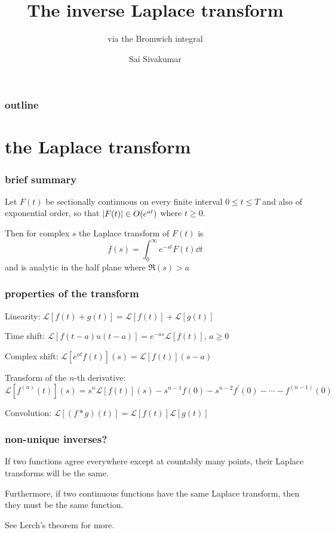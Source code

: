 \documentclass[mathserif]{beamer}
\title[The inverse Laplace transform] %
{The inverse Laplace transform}
\subtitle{via the Bromwich integral}
\author[Sai Sivakumar] %
{Sai Sivakumar}
\begin{document}
\frame{\titlepage}

\begin{frame}
\frametitle{outline}
\tableofcontents
\end{frame}

\section{the Laplace transform}

\begin{frame}
  \frametitle{brief summary}

  \begin{theorem}
    Let $F(t)$ be sectionally continuous on every finite interval $0\leq t\leq T$ and also of exponential order, so that $\abs{F(t)}\in O(e^{at})$ where $t\geq 0$.

    Then for complex $s$ the Laplace transform of $F(t)$ is \[f(s) = \int_0^\infty e^{-st}F(t)\dd{t}\] and is analytic in the half plane where $\Re(s) > a$
  \end{theorem}

\end{frame}

\begin{frame}
  \frametitle{properties of the transform}

  Linearity: $\mathcal{L}[f(t)+g(t)] = \mathcal{L}[f(t)] + \mathcal{L}[g(t)]$

  \pause Time shift: $\mathcal{L}[f(t-a)u(t-a)] = e^{-as}\mathcal{L}[f(t)]$, $a\geq 0$

  \pause Complex shift: $\mathcal{L}[e^{at}f(t)](s) = \mathcal{L}[f(t)](s-a)$

  \pause Transform of the $n$-th derivative: $\mathcal{L}[f^{(n)}(t)](s) = s^n\mathcal{L}[f(t)](s) - s^{n-1}f(0) - s^{n-2}f^{\prime}(0) - \cdots - f^{(n-1)}(0)$

  \pause Convolution: $\mathcal{L}[(f\ast g)(t)] = \mathcal{L}[f(t)]\mathcal{L}[g(t)]$
  
\end{frame}

\begin{frame}
  \frametitle{non-unique inverses?}

  If two functions agree everywhere except at countably many points, their Laplace transforms will be the same.

  \pause Furthermore, if two continuous functions have the same Laplace transform, then they must be the same function.

  
  See Lerch's theorem for more.

\end{frame}
\end{document}
